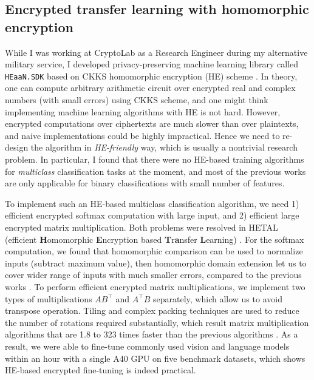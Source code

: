 \documentclass[12pt]{article}
\begin{document}
\subsection*{Encrypted transfer learning with homomorphic encryption}

While I was working at CryptoLab as a Research Engineer during my alternative military service, I developed privacy-preserving machine learning library called \texttt{HEaaN.SDK} \cite{heaansdk} based on CKKS homomorphic encryption (HE) scheme \cite{cheon2017homomorphic}.
In theory, one can compute arbitrary arithmetic circuit over encrypted real and complex numbers (with small errors) using CKKS scheme, and one might think implementing machine learning algorithms with HE is not hard.
However, encrypted computations over ciphertexts are much slower than over plaintexts, and naive implementations could be highly impractical.
Hence we need to re-design the algorithm in \emph{HE-friendly} way, which is usually a nontrivial research problem.
In particular, I found that there were no HE-based training algorithms for \emph{multiclass} classification tasks at the moment, and most of the previous works are only applicable for binary classifications with small number of features.

To implement such an HE-based multiclass classification algorithm, we need 1) efficient encrypted softmax computation with large input, and 2) efficient large encrypted matrix multiplication.
Both problems were resolved in HETAL (efficient \textbf{H}omomorphic \textbf{E}ncryption based \textbf{T}r\textbf{a}nsfer \textbf{L}earning) \cite{lee2023hetal}.
For the softmax computation, we found that homomorphic comparison \cite{cheon2020efficient} can be used to normalize inputs (subtract maximum value), then homomorphic domain extension \cite{cheon2022efficient} let us to cover wider range of inputs with much smaller errors, compared to the previous works \cite{jin2020secure,lee2022privacy,hong2022secure}.
To perform efficient encrypted matrix multiplications, we implement two types of multiplications $A B^\intercal$ and $A^\intercal B$ separately, which allow us to avoid transpose operation.
Tiling and complex packing techniques are used to reduce the number of rotations required substantially, which result matrix multiplication algorithms that are 1.8 to 323 times faster than the previous algorithms \cite{crockett2020low,jin2020secure}.
As a result, we were able to fine-tune commonly used vision and language models within an hour with a single A40 GPU on five benchmark datasets, which shows HE-based encrypted fine-tuning is indeed practical.




{
\scriptsize
}
\end{document}
